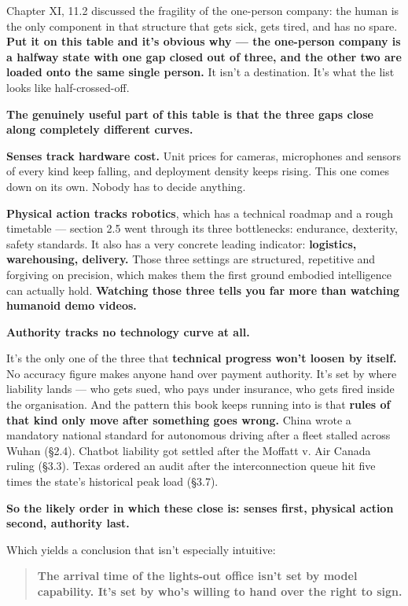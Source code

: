 \documentclass[11pt,a4paper]{article}
\begin{document}
Chapter XI, 11.2 discussed the fragility of the one-person company: the human is the only component in that structure that gets sick, gets tired, and has no spare. \textbf{Put it on this table and it's obvious why --- the one-person company is a halfway state with one gap closed out of three, and the other two are loaded onto the same single person.} It isn't a destination. It's what the list looks like half-crossed-off.

\textbf{The genuinely useful part of this table is that the three gaps close along completely different curves.}

\textbf{Senses track hardware cost.} Unit prices for cameras, microphones and sensors of every kind keep falling, and deployment density keeps rising. This one comes down on its own. Nobody has to decide anything.

\textbf{Physical action tracks robotics}, which has a technical roadmap and a rough timetable --- section 2.5 went through its three bottlenecks: endurance, dexterity, safety standards. It also has a very concrete leading indicator: \textbf{logistics, warehousing, delivery.} Those three settings are structured, repetitive and forgiving on precision, which makes them the first ground embodied intelligence can actually hold. \textbf{Watching those three tells you far more than watching humanoid demo videos.}

\textbf{Authority tracks no technology curve at all.}

It's the only one of the three that \textbf{technical progress won't loosen by itself.} No accuracy figure makes anyone hand over payment authority. It's set by where liability lands --- who gets sued, who pays under insurance, who gets fired inside the organisation. And the pattern this book keeps running into is that \textbf{rules of that kind only move after something goes wrong.} China wrote a mandatory national standard for autonomous driving after a fleet stalled across Wuhan (\S{}2.4). Chatbot liability got settled after the Moffatt v. Air Canada ruling (\S{}3.3). Texas ordered an audit after the interconnection queue hit five times the state's historical peak load (\S{}3.7).

\textbf{So the likely order in which these close is: senses first, physical action second, authority last.}

Which yields a conclusion that isn't especially intuitive:

\begin{quote}
\textbf{The arrival time of the lights-out office isn't set by model capability. It's set by who's willing to hand over the right to sign.}
\end{quote}
\end{document}
